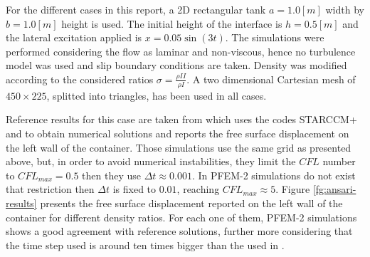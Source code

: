 For the different cases in this report, a 2D rectangular tank $a=1.0[m]$ width by $b=1.0[m]$ height is used. The initial height of the interface is $h=0.5[m]$ and the lateral excitation applied is $x=0.05\sin(3t)$. The simulations were performed considering the
flow as laminar and non-viscous, hence no turbulence model was used and slip boundary conditions are taken. Density was modified according to the considered ratios $\sigma=\frac{\rho{II}}{\rho{I}}$. A two dimensional Cartesian mesh of $450\times225$, splitted into triangles, has been used in all cases.

Reference results for this case are taken from \cite{Goni13} which uses the codes STARCCM+ and \OF to obtain numerical solutions and reports the free surface displacement on the left wall of the container. Those simulations use the same grid as presented above, but, in order to avoid numerical instabilities, they limit the $CFL$ number to $CFL_{max}=0.5$ then they use $\Delta t \approx 0.001$. In PFEM-2 simulations do not exist that restriction then $\Delta t$ is fixed to $0.01$, reaching $CFL_{max}\approx5$. 
Figure \ref{fg:ansari-results} presents the free surface displacement reported on the left wall of the container for different density ratios. For each one of them, PFEM-2 simulations shows a good agreement with reference solutions, further more considering that the time step used is around ten times bigger than the used in \cite{Goni13}.


